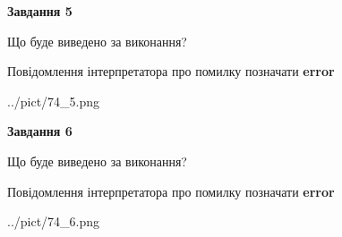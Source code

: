 \documentclass[12pt, ukrainian]{article}
\begin{document}
{{\begin {center}\textbf{Завдання 5}\end {center}}\par
Що буде виведено за виконання? \par
Повідомлення інтерпретатора про помилку позначати \textbf{error}

\begin{center}
	{../pict/74_5.png}
\end{center}
\newpage

{\begin {center}\textbf{Завдання 6}\end {center}}\par
Що буде виведено за виконання? \par
Повідомлення інтерпретатора про помилку позначати \textbf{error}

\begin{center}
	{../pict/74_6.png}
\end{center}
\newpage

}
\end{document}
